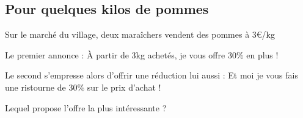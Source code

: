 \documentclass[oneside,12pt]{article}          %
\begin{document}
\subsection{Pour quelques kilos de pommes}
Sur le marché du village, deux maraîchers vendent des pommes à 3\euro/kg

Le premier annonce : \og À partir de 3kg achetés, je vous offre 30$\%$ en plus ! \fg

Le second s'empresse alors d'offrir une réduction lui aussi : \og Et moi je vous fais une ristourne de 30$\%$ sur le prix d'achat ! \fg

Lequel propose l'offre la plus intéressante ?
\end{document}
